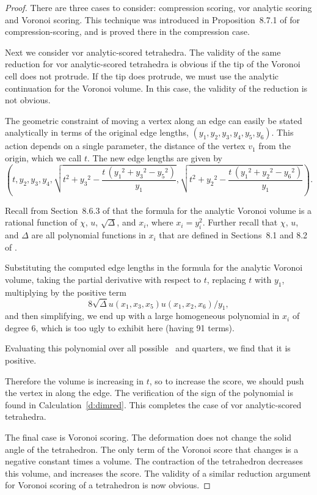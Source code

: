 \begin{proof}
There are three cases to consider: compression scoring, vor analytic
scoring and Voronoi scoring. This technique was introduced in
Proposition~8.7.1 of \cite{part1} for compression-scoring, and is
proved there in the compression case.

Next we consider vor analytic-scored tetrahedra.  The validity of
the same reduction for vor analytic-scored tetrahedra is obvious if
the tip of the Voronoi cell does not protrude. If the tip does
protrude, we must use the analytic continuation for the Voronoi
volume.  In this case, the validity of the reduction is not obvious.

The geometric constraint of moving a vertex along an edge
can easily be stated analytically in terms of the original edge
lengths, $(y_1, y_2, y_3, y_4, y_5, y_6)$.
This action depends on a single parameter, the
distance of the vertex $v_1$ from the origin, which we call $t$.
The new edge lengths are given by
\[
( t, y_2, y_3,
  y_4,\sqrt{{t^2} + {{{y_3}}^2} -
   {\frac{t\,\left( {{{y_1}}^2} +
         {{{y_3}}^2} - {{{y_5}}^2}
         \right) }{{y_1}}}},
  \sqrt{{t^2} + {{{y_2}}^2} -
   {\frac{t\,\left( {{{y_1}}^2} +
         {{{y_2}}^2} - {{{y_6}}^2}
         \right) }{{y_1}}}} ).
\]

Recall from Section~8.6.3 of \cite{part1} that the formula for the
analytic Voronoi volume is a rational function of $\chi$, $u$,
$\sqrt{\Delta}$, and $x_i$, where $x_i = y_i^2$.  Further recall
that $\chi$, $u$, and $\Delta$ are all polynomial functions in $x_i$
that are defined in Sections~8.1 and 8.2 of \cite{part1}.

Substituting the computed edge lengths in the formula for the analytic
Voronoi volume, taking the partial derivative with
respect to $t$, replacing $t$ with $y_1$, multiplying by the positive
term
\[
8 \sqrt{\Delta} u(x_1, x_3, x_5) u(x_1, x_2, x_6)/y_1,
\]
and then simplifying, we end up with a large homogeneous
polynomial in $x_i$ of degree 6, which is too ugly to exhibit here (having
91 terms).

Evaluating this polynomial over all possible
\qrtets\ and quarters, we find that it is positive.

Therefore the volume is increasing in $t$, so to increase the score,
we should push the vertex in along the edge. The verification of the
sign of the polynomial is found in Calculation~\ref{d:dimred}. This
completes the case of vor analytic-scored tetrahedra.

The final case is Voronoi scoring.  The deformation does not change
the solid angle of the tetrahedron.  The only term of the Voronoi
score that changes is a negative constant times a volume. The
contraction of the tetrahedron decreases this volume, and increases
the score. The validity of a similar reduction argument for Voronoi
scoring of a tetrahedron is now obvious.
\end{proof}


